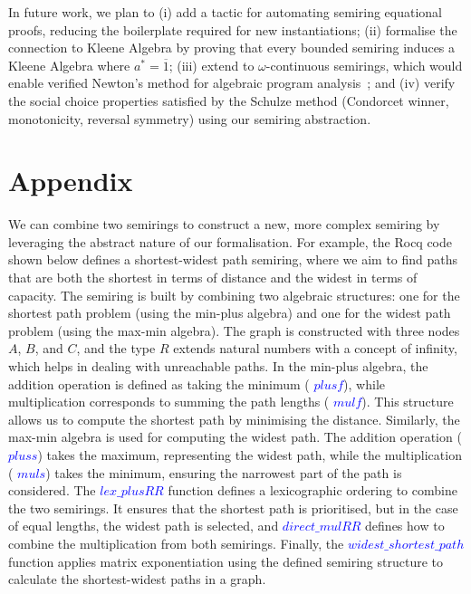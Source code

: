 \documentclass[a4paper,UKenglish,cleveref, autoref, thm-restate, anonymous]{lipics-v2021}
\begin{document}
In future work, we plan to (i) add a tactic for automating semiring
equational proofs, reducing the boilerplate required for new
instantiations; (ii) formalise the connection to Kleene Algebra by
proving that every bounded semiring induces a Kleene Algebra where
$a^{*} = \overline{1}$; (iii) extend to $\omega$-continuous semirings,
which would enable verified Newton's method for algebraic program
analysis~\cite{esparza2010newtonian}; and (iv) verify the social
choice properties satisfied by the Schulze method (Condorcet winner,
monotonicity, reversal symmetry) using our semiring abstraction.



\appendix

\section{Appendix}\label{appendix}
We can combine two semirings to construct a new, more complex semiring by leveraging the abstract nature of our formalisation. For example, the Rocq code shown below defines a shortest-widest path semiring, where we aim to find paths that are both the shortest in terms of distance and the widest in terms of capacity. The semiring is built by combining two algebraic structures: one for the shortest path problem (using the min-plus algebra) and one for the widest path problem (using the max-min algebra).  The graph is constructed with three nodes $A$, $B$, and $C$, and 
the type $R$ extends natural numbers with a concept of infinity, which helps in dealing with unreachable paths.  In the min-plus algebra, the addition operation is defined as taking the minimum ( \textcolor{blue}{$plusf$}), while multiplication corresponds to summing the path lengths ( \textcolor{blue}{$mulf$}). This structure allows us to compute the shortest path by minimising the distance.
Similarly, the max-min algebra is used for computing the widest path. The addition operation ( \textcolor{blue}{$pluss$}) takes the maximum, representing the widest path, while the multiplication ( \textcolor{blue}{$muls$}) takes the minimum, ensuring the narrowest part of the path is considered. The \textcolor{blue}{$lex\_plusRR$} function defines a lexicographic ordering to combine the two semirings. It ensures that the shortest path is prioritised, but in the case of equal lengths, the widest path is selected, and  \textcolor{blue}{$direct\_mulRR$} defines how to combine the multiplication from both semirings. Finally, the  \textcolor{blue}{$widest\_shortest\_path$} function applies matrix exponentiation using the defined semiring structure to calculate the shortest-widest paths in a graph.
\end{document}
